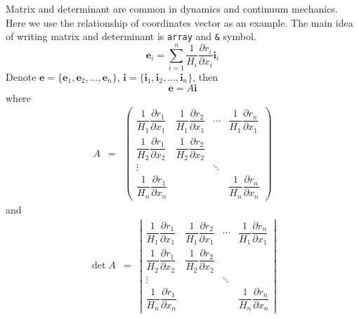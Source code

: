 Matrix and determinant are common in dynamics and continuum mechanics. Here we use the relationship of coordinates vector as an example. The main idea of writing matrix and determinant is \verb|array| and \verb|&| symbol.
\begin{equation}
    \textbf{e}_i = \sum_{i = 1}^n \dfrac{1}{H_i} \dfrac{\partial r_i}{\partial
        x_i} \textbf{i}_i
\end{equation}
Denote \(\textbf{e} = \{ \textbf{e}_1, \textbf{e}_2, \ldots,
\textbf{e}_n \}\), \(\textbf{i} = \{ \textbf{i}_1, \textbf{i}_2, \ldots,
\textbf{i}_n \}\), then
\begin{equation}
    \textbf{e} = A \textbf{i}
\end{equation}
where
\begin{eqnarray}
    A & = & \left(\begin{array}{cccc}
        \dfrac{1}{H_1} \dfrac{\partial r_1}{\partial x_1} & \dfrac{1}{H_1}
        \dfrac{\partial r_2}{\partial x_1}                & \cdots         & \dfrac{1}{H_1} \dfrac{\partial
            r_n}{\partial x_1}                                                                                               \\
        \dfrac{1}{H_2} \dfrac{\partial r_1}{\partial x_2} & \dfrac{1}{H_2}
        \dfrac{\partial r_2}{\partial x_2}                &                &                                                 \\
        \vdots                                            &                & \ddots                         &                \\
        \dfrac{1}{H_n} \dfrac{\partial r_1}{\partial x_n} &                &                                & \dfrac{1}{H_n}
        \dfrac{\partial r_n}{\partial x_n}
    \end{array}\right)
\end{eqnarray}
and
\begin{eqnarray}
    \det A & = & \left|\begin{array}{cccc}
        \dfrac{1}{H_1} \dfrac{\partial r_1}{\partial x_1} & \dfrac{1}{H_1}
        \dfrac{\partial r_2}{\partial x_1}                & \cdots         & \dfrac{1}{H_1} \dfrac{\partial
            r_n}{\partial x_1}                                                                                               \\
        \dfrac{1}{H_2} \dfrac{\partial r_1}{\partial x_2} & \dfrac{1}{H_2}
        \dfrac{\partial r_2}{\partial x_2}                &                &                                                 \\
        \vdots                                            &                & \ddots                         &                \\
        \dfrac{1}{H_n} \dfrac{\partial r_1}{\partial x_n} &                &                                & \dfrac{1}{H_n}
        \dfrac{\partial r_n}{\partial x_n}
    \end{array}\right|
\end{eqnarray}

